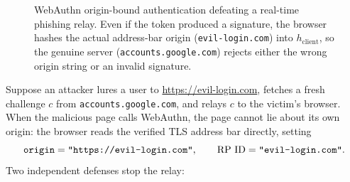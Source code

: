 \begin{figure}[htbp]
\caption{WebAuthn origin-bound authentication defeating a real-time phishing relay. Even if the token produced a signature, the browser hashes the actual address-bar origin (\texttt{evil-login.com}) into $h_{\text{client}}$, so the genuine server (\texttt{accounts.google.com}) rejects either the wrong origin string or an invalid signature.}
\label{ch14:fig-argon2-webauthn}
\end{figure}

Suppose an attacker lures a user to \url{https://evil-login.com}, fetches a fresh challenge $c$ from \texttt{accounts.google.com}, and relays $c$ to the victim's browser. When the malicious page calls WebAuthn, the page cannot lie about its own origin: the browser reads the verified TLS address bar directly, setting
\[
  \text{\texttt{origin}} = \texttt{"https://evil-login.com"}, \qquad
  \text{RP ID} = \texttt{"evil-login.com"}.
\]
Two independent defenses stop the relay:

